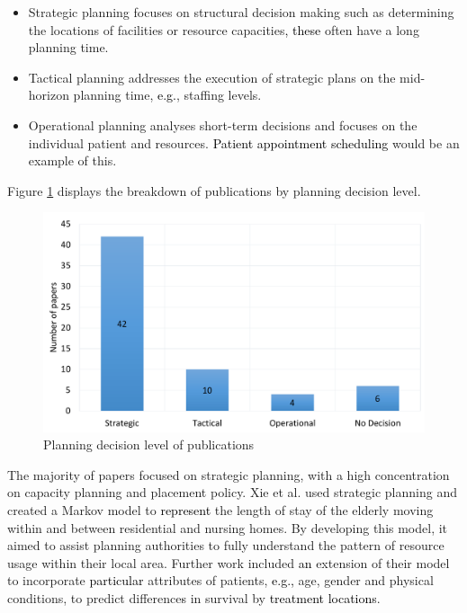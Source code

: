 \documentclass[../thesis.tex]{subfiles}
\begin{document}
\begin{itemize}
    \item Strategic planning focuses on structural decision making such as determining the locations of facilities or resource capacities\textcolor{black}{, these} often have a long planning time.
    \item Tactical planning addresses the execution of strategic plans on the mid-horizon planning time, \textcolor{black}{e.g.}, staffing levels.
    \item Operational planning analyses short-term decisions and focuses on the individual patient and resources. \textcolor{black}{Patient appointment scheduling} would be an example of this.
\end{itemize}

Figure \ref{fig:PlanningDecision} displays the breakdown of publications by planning decision level.

\begin{figure}[H]
\centering
    \includegraphics[scale = 0.3]{Chapter2/Figures/Planning1.pdf}
   \caption{Planning decision level of publications} \label{fig:PlanningDecision}
\end{figure}

The majority of papers focused on strategic planning, with a high concentration on capacity planning and placement policy. Xie et al. \cite{Xie} used strategic planning and created a Markov model to \textcolor{black}{represent} the length of stay of the elderly moving within and between residential and nursing homes. By developing this model, it aimed to assist planning authorities to fully understand the pattern of resource usage within their local area. Further work included \textcolor{black}{an} extension of their model to incorporate \textcolor{black}{particular} attributes of patients, \textcolor{black}{e.g.,} age, gender and physical conditions, to predict difference\textcolor{black}{s} in survival by \textcolor{black}{treatment locations}.
\end{document}
